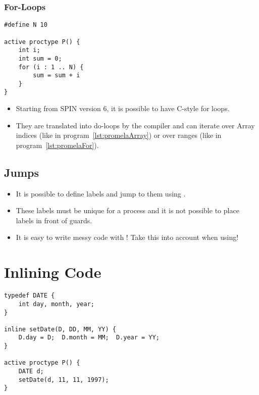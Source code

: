 		\subsubsection{For-Loops}
			\begin{lstlisting}[caption = { PROMELA For-Loops }, label = lst:promelaFor, language = PROMELA]
#define N 10

active proctype P() {
	int i;
	int sum = 0;
	for (i : 1 .. N) {
		sum = sum + i
	}
}
				\end{lstlisting}

			\begin{itemize}
				\item Starting from SPIN version 6, it is possible to have C-style for loops.
				\item They are translated into do-loops by the compiler and can iterate over Array indices (like in program~\ref{lst:promelaArray}) or over ranges (like in program~\ref{lst:promelaFor}).
			\end{itemize}

	\subsection{Jumps}
		

		\begin{itemize}
			\item It is possible to define labels and jump to them using .
			\item These labels must be unique for a process and it is not possible to place labels in front of guards.
			\item It is easy to write messy code with ! Take this into account when using!
		\end{itemize}

\section{Inlining Code}
	\begin{lstlisting}[caption = { PROMELA Inlines }, label = lst:promelaInline, language = PROMELA]
typedef DATE {
	int day, month, year;
}

inline setDate(D, DD, MM, YY) {
	D.day = D;  D.month = MM;  D.year = YY;
}

active proctype P() {
	DATE d;
	setDate(d, 11, 11, 1997);
}
		\end{lstlisting}

